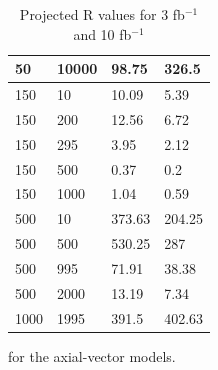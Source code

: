 \begin{table}[h]
\begin{tabular}{llll}
50      & 10000   & 98.75   & 326.5 \\ \hline
150     & 10      & 10.09   & 5.39 \\ \hline
150     & 200     & 12.56   & 6.72 \\ \hline
150     & 295     & 3.95    & 2.12 \\ \hline
150     & 500     & 0.37    & 0.2 \\ \hline
150     & 1000    & 1.04    & 0.59 \\ \hline
500     & 10      & 373.63  & 204.25 \\ \hline
500     & 500     & 530.25  & 287 \\ \hline
500     & 995     & 71.91   & 38.38 \\ \hline
500     & 2000    & 13.19   & 7.34 \\ \hline
1000    & 1995    & 391.5   & 402.63 \\ \hline
\end{tabular}
\caption{Projected R values for 3 fb$^{-1}$ and 10 fb$^{-1}$} for the axial-vector models.
\label{tab:dm_A_R_values}
\end{table}


